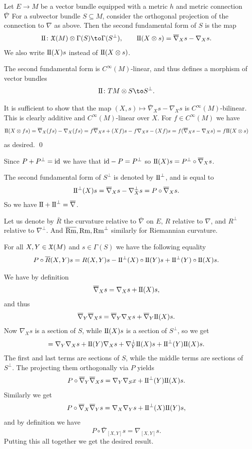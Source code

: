     Let $E\to M$ be a vector bundle equipped with a metric $h$ and metric connection $\bar\nabla$
    For a subvector bundle $S\subseteq M$, consider the orthogonal projection of the connection to $\nabla$ as above.
    Then the {\emphcolor second fundamental form} of $S$ is the map
    $$ \sff\colon \X(M)\otimes\Gamma(S)\to\Gamma(S^\perp),\qquad \sff(X\otimes s) = \bar\nabla_Xs - \nabla_Xs . $$
    We also write ${\rm I\mkern-1mu\relax I}(X)s$ instead of ${\rm I\mkern-1mu\relax I}(X\otimes s)$.

\edefn

\blemm

    The second fundamental form is $C^\infty(M)$-linear, and thus defines a morphism of vector bundles
    $$ \sff\colon TM\otimes S\to S^\perp . $$

\elemm

\bproof

    It is sufficient to show that the map $(X,s)\mapsto\bar\nabla_Xs-\nabla_Xs$ is $C^\infty(M)$-bilinear.
    This is clearly additive and $C^\infty(M)$-linear over $X$.
    For $f\in C^\infty(M)$ we have
    $$ {\rm I\mkern-1mu\relax I}(X\otimes fs) = \overline\nabla_X(fs) - \nabla_X(fs) = f\overline\nabla_Xs + (Xf)s - f\nabla_Xs - (Xf)s = f(\overline\nabla_Xs - \nabla_Xs)
    = f{\rm I\mkern-1mu\relax I}(X\otimes s) $$
    as desired.
    \qed

\eproof

Since $P+P^\perp={\rm id}$ we have that ${\rm id}-P=P^\perp$ so ${\rm I\mkern-1mu\relax I}(X)s=P^\perp\circ\overline\nabla_Xs$.

The second fundamental form of $S^\perp$ is denoted by ${\rm I\mkern-1mu\relax I}^\perp$, and is equal to
$$ {\rm I\mkern-1mu\relax I}^\perp(X)s = \overline\nabla_Xs - \nabla_X^\perp s = P\circ\overline\nabla_Xs . $$
So we have ${\rm I\mkern-1mu\relax I}+{\rm I\mkern-1mu\relax I}^\perp=\overline\nabla$.

Let us denote by $\bar R$ the curvature relative to $\bar\nabla$ on $E$, $R$ relative to $\nabla$, and $R^\perp$ relative to $\nabla^\perp$.
And $\overline{{\rm Rm}},{\rm Rm},{\rm Rm}^\perp$ similarly for Riemannian curvature.

\bthrm[title=Gauss]

    For all $X,Y\in{\frak X}(M)$ and $s\in\Gamma(S)$ we have the following equality
    $$ P\circ\overline R(X,Y)s = R(X,Y)s - {\rm I\mkern-1mu\relax I}^\perp(X)\circ{\rm I\mkern-1mu\relax I}(Y)s + {\rm I\mkern-1mu\relax I}^\perp(Y)\circ{\rm I\mkern-1mu\relax I}(X)s . $$

\ethrm

\bproof

    We have by definition
    $$ \overline\nabla_Xs = \nabla_Xs + {\rm I\mkern-1mu\relax I}(X)s , $$
    and thus
    $$ \overline\nabla_Y\overline\nabla_Xs = \overline\nabla_Y\nabla_Xs + \overline\nabla_Y{\rm I\mkern-1mu\relax I}(X)s . $$
    Now $\nabla_Xs$ is a section of $S$, while ${\rm I\mkern-1mu\relax I}(X)s$ is a section of $S^\perp$, so we get
    $$ = \nabla_Y\nabla_Xs + {\rm I\mkern-1mu\relax I}(Y)\nabla_Xs + \nabla_Y^\perp{\rm I\mkern-1mu\relax I}(X)s + {\rm I\mkern-1mu\relax I}^\perp(Y){\rm I\mkern-1mu\relax I}(X)s . $$
    The first and last terms are sections of $S$, while the middle terms are sections of $S^\perp$.
    The projecting them orthogonally via $P$ yields
    $$ P\circ\overline\nabla_Y\overline\nabla_Xs = \nabla_Y\nabla_Sx + {\rm I\mkern-1mu\relax I}^\perp(Y){\rm I\mkern-1mu\relax I}(X)s . $$
    Similarly we get
    $$ P\circ\overline\nabla_X\overline\nabla_Ys = \nabla_X\nabla_Ys + {\rm I\mkern-1mu\relax I}^\perp(X){\rm I\mkern-1mu\relax I}(Y)s , $$
    and by definition we have
    $$ P\circ\bar\nabla_{[X,Y]}s = \nabla_{[X,Y]}s . $$
    Putting this all together we get the desired result.

